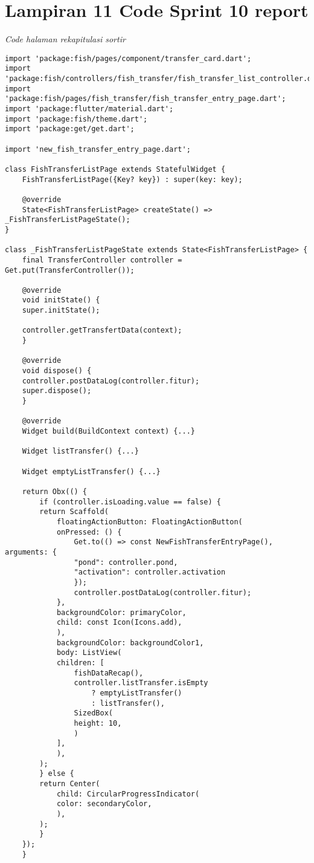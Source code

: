 	\section{Lampiran 11 Code Sprint 10 report}
	\textit{Code halaman rekapitulasi sortir}
	\begin{lstlisting}
import 'package:fish/pages/component/transfer_card.dart';
import 'package:fish/controllers/fish_transfer/fish_transfer_list_controller.dart';
import 'package:fish/pages/fish_transfer/fish_transfer_entry_page.dart';
import 'package:flutter/material.dart';
import 'package:fish/theme.dart';
import 'package:get/get.dart';

import 'new_fish_transfer_entry_page.dart';

class FishTransferListPage extends StatefulWidget {
    FishTransferListPage({Key? key}) : super(key: key);

    @override
    State<FishTransferListPage> createState() => _FishTransferListPageState();
}

class _FishTransferListPageState extends State<FishTransferListPage> {
    final TransferController controller = Get.put(TransferController());

    @override
    void initState() {
    super.initState();

    controller.getTransfertData(context);
    }

    @override
    void dispose() {
    controller.postDataLog(controller.fitur);
    super.dispose();
    }

    @override
    Widget build(BuildContext context) {...}

    Widget listTransfer() {...}

    Widget emptyListTransfer() {...}

    return Obx(() {
        if (controller.isLoading.value == false) {
        return Scaffold(
            floatingActionButton: FloatingActionButton(
            onPressed: () {
                Get.to(() => const NewFishTransferEntryPage(), arguments: {
                "pond": controller.pond,
                "activation": controller.activation
                });
                controller.postDataLog(controller.fitur);
            },
            backgroundColor: primaryColor,
            child: const Icon(Icons.add),
            ),
            backgroundColor: backgroundColor1,
            body: ListView(
            children: [
                fishDataRecap(),
                controller.listTransfer.isEmpty
                    ? emptyListTransfer()
                    : listTransfer(),
                SizedBox(
                height: 10,
                )
            ],
            ),
        );
        } else {
        return Center(
            child: CircularProgressIndicator(
            color: secondaryColor,
            ),
        );
        }
    });
    }
     
	\end{lstlisting}
	
